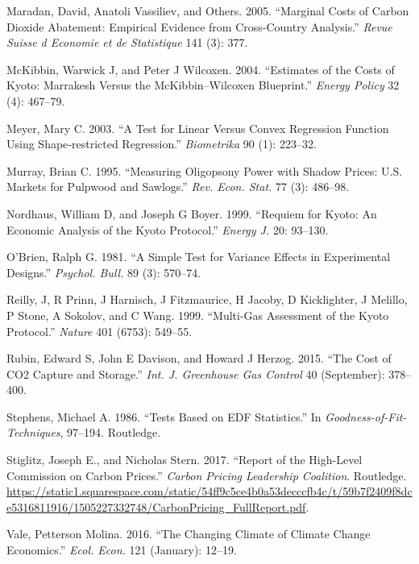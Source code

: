 \documentclass[
  10pt,
]{article}
\begin{document}
\leavevmode\hypertarget{ref-Maradan2005}{}%
Maradan, David, Anatoli Vassiliev, and Others. 2005. ``Marginal Costs of
Carbon Dioxide Abatement: Empirical Evidence from Cross-Country
Analysis.'' \emph{Revue Suisse d Economie et de Statistique} 141 (3):
377.

\leavevmode\hypertarget{ref-McKibbin2004}{}%
McKibbin, Warwick J, and Peter J Wilcoxen. 2004. ``Estimates of the
Costs of Kyoto: Marrakesh Versus the McKibbin--Wilcoxen Blueprint.''
\emph{Energy Policy} 32 (4): 467--79.

\leavevmode\hypertarget{ref-Meyer2003}{}%
Meyer, Mary C. 2003. ``A Test for Linear Versus Convex Regression
Function Using Shape‐restricted Regression.'' \emph{Biometrika} 90 (1):
223--32.

\leavevmode\hypertarget{ref-Murray1995}{}%
Murray, Brian C. 1995. ``Measuring Oligopsony Power with Shadow Prices:
U.S. Markets for Pulpwood and Sawlogs.'' \emph{Rev. Econ. Stat.} 77 (3):
486--98.

\leavevmode\hypertarget{ref-Nordhaus1999}{}%
Nordhaus, William D, and Joseph G Boyer. 1999. ``Requiem for Kyoto: An
Economic Analysis of the Kyoto Protocol.'' \emph{Energy J.} 20: 93--130.

\leavevmode\hypertarget{ref-OBrien1981}{}%
O'Brien, Ralph G. 1981. ``A Simple Test for Variance Effects in
Experimental Designs.'' \emph{Psychol. Bull.} 89 (3): 570--74.

\leavevmode\hypertarget{ref-Reilly1999}{}%
Reilly, J, R Prinn, J Harnisch, J Fitzmaurice, H Jacoby, D Kicklighter,
J Melillo, P Stone, A Sokolov, and C Wang. 1999. ``Multi-Gas Assessment
of the Kyoto Protocol.'' \emph{Nature} 401 (6753): 549--55.

\leavevmode\hypertarget{ref-Rubin2015}{}%
Rubin, Edward S, John E Davison, and Howard J Herzog. 2015. ``The Cost
of CO2 Capture and Storage.'' \emph{Int. J. Greenhouse Gas Control} 40
(September): 378--400.

\leavevmode\hypertarget{ref-Stephens1986}{}%
Stephens, Michael A. 1986. ``Tests Based on EDF Statistics.'' In
\emph{Goodness-of-Fit-Techniques}, 97--194. Routledge.

\leavevmode\hypertarget{ref-CPLC2017}{}%
Stiglitz, Joseph E., and Nicholas Stern. 2017. ``Report of the
High-Level Commission on Carbon Prices.'' \emph{Carbon Pricing
Leadership Coalition}. Routledge.
\url{https://static1.squarespace.com/static/54ff9c5ce4b0a53decccfb4c/t/59b7f2409f8dce5316811916/1505227332748/CarbonPricing_FullReport.pdf}.

\leavevmode\hypertarget{ref-Vale2016}{}%
Vale, Petterson Molina. 2016. ``The Changing Climate of Climate Change
Economics.'' \emph{Ecol. Econ.} 121 (January): 12--19.
\end{document}
